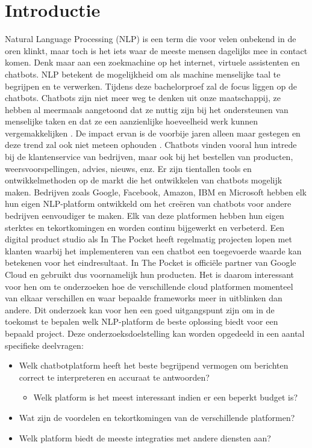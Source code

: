 
\section{Introductie} %
\label{sec:introductie}
Natural Language Processing (NLP) is een term die voor velen onbekend in de oren klinkt, maar toch is het iets waar de meeste mensen dagelijks mee in contact komen. Denk maar aan een zoekmachine op het internet, virtuele assistenten en chatbots. NLP betekent de mogelijkheid om als machine menselijke taal te begrijpen en te verwerken. Tijdens deze bachelorproef zal de focus liggen op de chatbots. Chatbots zijn niet meer weg te denken uit onze maatschappij, ze hebben al meermaals aangetoond dat ze nuttig zijn bij het ondersteunen van menselijke taken en dat ze een aanzienlijke hoeveelheid werk kunnen vergemakkelijken \autocite{Atwell2007}. De impact ervan is de voorbije jaren alleen maar gestegen en deze trend zal ook niet meteen ophouden \autocite{BRAIN2019}. Chatbots vinden vooral hun intrede bij de klantenservice van bedrijven, maar ook bij het bestellen van producten, weersvoorspellingen, advies, nieuws, enz. Er zijn tientallen tools en ontwikkelmethoden op de markt die het ontwikkelen van chatbots mogelijk maken. Bedrijven zoals Google, Facebook, Amazon, IBM en Microsoft hebben elk hun eigen NLP-platform ontwikkeld om het creëren van chatbots voor andere bedrijven eenvoudiger te maken. Elk van deze platformen hebben hun eigen sterktes en tekortkomingen en worden continu bijgewerkt en verbeterd. Een digital product studio als In The Pocket heeft regelmatig projecten lopen met klanten waarbij het implementeren van een chatbot een toegevoerde waarde kan betekenen voor het eindresultaat. In The Pocket is officiële partner van Google Cloud en gebruikt dus voornamelijk hun producten. Het is daarom interessant voor hen om te onderzoeken hoe de verschillende cloud platformen momenteel van elkaar verschillen en waar bepaalde frameworks meer in uitblinken dan andere. Dit onderzoek kan voor hen een goed uitgangspunt zijn om in de toekomst te bepalen welk NLP-platform de beste oplossing biedt voor een bepaald project. Deze onderzoeksdoelstelling kan worden opgedeeld in een aantal specifieke deelvragen:
\bigskip
\begin{itemize}
  \item Welk chatbotplatform heeft het beste begrijpend vermogen om berichten correct te interpreteren en accuraat te antwoorden? 
  \begin{itemize}
      \item Welk platform is het meest interessant indien er een beperkt budget is?
  \end{itemize}
  \item Wat zijn de voordelen en tekortkomingen van de verschillende platformen?
  \item Welk platform biedt de meeste integraties met andere diensten aan?
\end{itemize}

